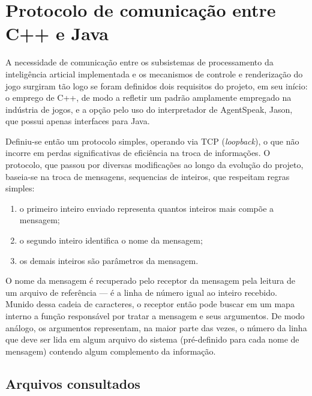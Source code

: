 \chapter{Protocolo de comunicação entre C++ e Java}\label{ap:protocolo}

A necessidade de comunicação entre os subsistemas de processamento da inteligência articial implementada e os mecanismos de controle e renderização do jogo surgiram tão logo se foram definidos dois requisitos do projeto, em seu início: o emprego de C++, de modo a refletir um padrão amplamente empregado na indústria de jogos, e a opção pelo uso do interpretador de AgentSpeak, Jason, que possui apenas interfaces para Java.

Definiu-se então um protocolo simples, operando via TCP (\emph{loopback}), o que não incorre em perdas significativas de eficiência na troca de informações. O protocolo, que passou por diversas modificações ao longo da evolução do projeto, baseia-se na troca de mensagens, sequencias de inteiros, que respeitam regras simples:
\begin{enumerate}
\item o primeiro inteiro enviado representa quantos inteiros mais compõe a mensagem;
\item o segundo inteiro identifica o nome da mensagem;
\item os demais inteiros são parâmetros da mensagem.
\end{enumerate}

O nome da mensagem é recuperado pelo receptor da mensagem pela leitura de um arquivo de referência --- é a linha de número igual ao inteiro recebido. Munido dessa cadeia de caracteres, o receptor então pode buscar em um mapa interno a função responsável por tratar a mensagem e seus argumentos. De modo análogo, os argumentos representam, na maior parte das vezes, o número da linha que deve ser lida em algum arquivo do sistema (pré-definido para cada nome de mensagem) contendo algum complemento da informação.

\section{Arquivos consultados}

